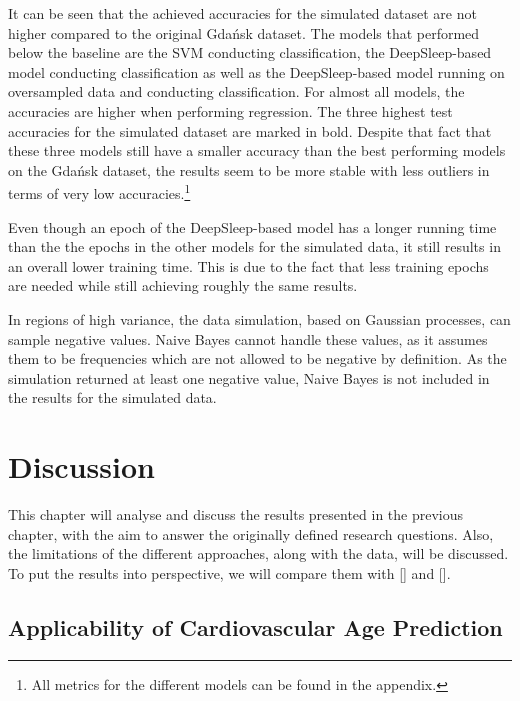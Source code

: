 \documentclass[11pt]{scrartcl}
\begin{document}
It can be seen that the achieved accuracies for the simulated dataset are not higher compared to the original Gdańsk dataset. The models that performed below the baseline are the SVM conducting classification, the DeepSleep-based model conducting classification as well as the DeepSleep-based model running on oversampled data and conducting classification. For almost all models, the accuracies are higher when performing regression. The three highest test accuracies for the simulated dataset are marked in bold. Despite that fact that these three models still have a smaller accuracy than the best performing models on the Gdańsk dataset, the results seem to be more stable with less outliers in terms of very low accuracies.\footnote{All metrics for the different models can be found in the appendix.}

Even though an epoch of the DeepSleep-based model has a longer running time than the the epochs in the other models for the simulated data, it still results in an overall lower training time. This is due to the fact that less training epochs are needed while still achieving roughly the same results.

In regions of high variance, the data simulation, based on Gaussian processes, can sample negative values. Naive Bayes cannot handle these values, as it assumes them to be frequencies which are not allowed to be negative by definition. As the simulation returned at least one negative value, Naive Bayes is not included in the results for the simulated data.

\clearpage
\section{Discussion}

This chapter will analyse and discuss the results presented in the previous chapter, with the aim to answer the originally defined research questions. Also, the limitations of the different approaches, along with the data, will be discussed. To put the results into perspective, we will compare them with [\cite{threeclassclassification}] and [\cite{patternshrd}].

\subsection{Applicability of Cardiovascular Age Prediction}
\end{document}
